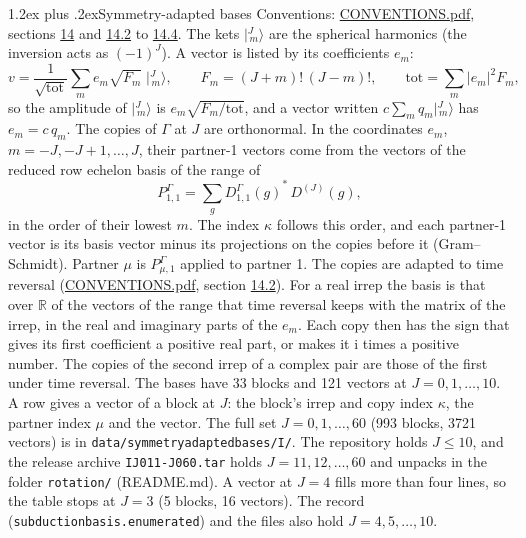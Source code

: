 \documentclass[10pt,a4paper]{article}
\makeatletter
\renewcommand\section{\@startsection{section}{1}{\z@}{-3ex plus -1ex minus -.2ex}%
  {1.2ex plus .2ex}{\normalfont\large\sffamily\bfseries\color{parttitle}}}
\numberwithin{equation}{section}
\newcommand{\iunit}{\mathrm{i}}
\newcommand{\irrJ}[1]{D^{(#1)}}
\newcommand{\repD}[1]{D^{#1}}
\newcommand{\conj}[1]{{#1}^{*}}
\newcommand{\mult}{\kappa}
\newcommand{\intx}{\mu}
\newcommand{\jm}[2]{\bigl\lvert{}^{#1}_{\,#2}\bigr\rangle}
\makeatother
\begin{document}
\section{Symmetry-adapted bases}\label{s:bases}
Conventions: \href{../../CONVENTIONS.pdf}{CONVENTIONS.pdf}, sections \href{../../CONVENTIONS.pdf\#conv.14}{14} and \href{../../CONVENTIONS.pdf\#conv.14.2}{14.2} to \href{../../CONVENTIONS.pdf\#conv.14.4}{14.4}.
\leavevmode\label{n:index.m}\label{n:vector.ket}The kets $\jm{J}{m}$ are the spherical harmonics (the inversion acts as $(-1)^J$). \label{n:index.ketcoefficient}\label{n:vector.basis.symmetry}\label{n:index.ketweight}\label{n:index.total}A vector is listed by its coefficients $e_m$:
\begin{equation}\label{e:ket}v = \frac{1}{\sqrt{\mathrm{tot}}}\sum_m e_m\sqrt{F_m}\;\jm{J}{m},\qquad F_m = (J+m)!\,(J-m)!,\qquad \mathrm{tot} = \sum_m |e_m|^2F_m,\end{equation}
\leavevmode\label{n:index.factor.c}\label{n:index.multiplicity.copies}so the amplitude of $\jm{J}{m}$ is $e_m\sqrt{F_m/\mathrm{tot}}$, and a vector written $c\sum_m q_m\jm{J}{m}$ has $e_m = c\,q_m$.
The copies of $\Gamma$ at $J$ are orthonormal. \label{n:matrix.projector}In the coordinates $e_m$, $m = -J, -J+1, \dots, J$, their partner-1 vectors come from the vectors of the reduced row echelon basis of the range of
\begin{equation}\label{e:projector}P^\Gamma_{1,1} = \sum_g \conj{\repD{\Gamma}_{1,1}(g)}\,\irrJ{J}(g),\end{equation}
in the order of their lowest $m$. The index $\mult$ follows this order, and each partner-1 vector is its basis vector minus its projections on the copies before it (Gram--Schmidt). Partner $\intx$ is $P^\Gamma_{\intx,1}$ applied to partner 1. The copies are adapted to time reversal (\href{../../CONVENTIONS.pdf}{CONVENTIONS.pdf}, section \href{../../CONVENTIONS.pdf\#conv.14.2}{14.2}). For a real irrep the basis is that over $\mathbb{R}$ of the vectors of the range that time reversal keeps with the matrix of the irrep, in the real and imaginary parts of the $e_m$. Each copy then has the sign that gives its first coefficient a positive real part, or makes it $\iunit$ times a positive number. The copies of the second irrep of a complex pair are those of the first under time reversal.
The bases have 33 blocks and 121 vectors at $J = 0, 1, \dots, 10$. \label{n:head.vector}A row gives a vector of a block at $J$: the block's irrep and copy index $\mult$, the partner index $\intx$ and the vector. The full set $J = 0, 1, \dots, 60$ (993 blocks, 3721 vectors) is in \texttt{data/symmetryadaptedbases/I/}. The repository holds $J \le 10$, and the release archive \texttt{IJ011-J060.tar} holds $J = 11, 12, \dots, 60$ and unpacks in the folder \texttt{rotation/} (README.md). A vector at $J = 4$ fills more than four lines, so the table stops at $J = 3$ (5 blocks, 16 vectors). The record (\texttt{subductionbasis.\allowbreak enumerated}) and the files also hold $J = 4, 5, \dots, 10$.
\end{document}
